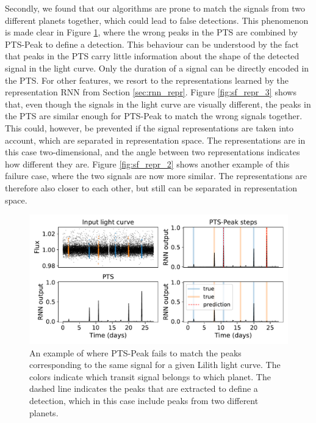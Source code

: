 Secondly,  we found that our algorithms are prone to match the signals from two different planets together, which could lead to false detections. This phenomenon is made clear in Figure \ref{fig:sf_multi_not_peak}, where the wrong peaks in the PTS are combined by PTS-Peak to define a detection. This behaviour can be understood by the fact that peaks in the PTS carry little information about the shape of the detected signal in the light curve. Only the duration of a signal can be directly encoded in the PTS. For other features, we resort to the representations learned by the representation RNN from Section \ref{sec:rnn_repr}. Figure \ref{fig:sf_repr_3} shows that, even though the signals in the light curve are visually different, the peaks in the PTS are similar enough for PTS-Peak to match the wrong signals together. This could, however, be prevented if the signal representations are taken into account, which are separated in representation space. The representations are in this case two-dimensional, and the angle between two representations indicates how different they are. Figure \ref{fig:sf_repr_2} shows another example of this failure case, where the two signals are now more similar. The representations are therefore also closer to each other, but still can be separated in representation space.

\begin{figure}
    \centering
    \includegraphics[width=0.6\linewidth]{Experiments/Figures/Cases/sf_multi_not_peak_2.pdf}
    \caption{An example of where PTS-Peak fails to match the peaks corresponding to the same signal for a given Lilith light curve. The colors indicate which transit signal belongs to which planet. The dashed line indicates the peaks that are extracted to define a detection, which in this case include peaks from two different planets.}
    \label{fig:sf_multi_not_peak}
\end{figure}

